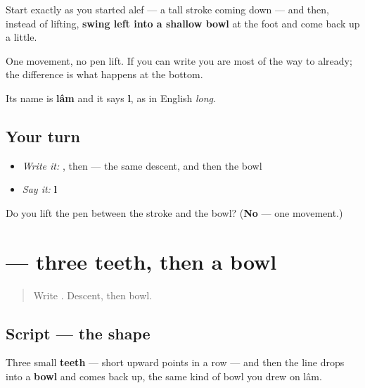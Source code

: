 \begin{quote}
\end{quote}

Start exactly as you started alef — a tall stroke coming down — and then, instead of lifting, \textbf{swing left into a shallow bowl} at the foot and come back up a little.

One movement, no pen lift. If you can write  you are most of the way to  already; the difference is what happens at the bottom.

Its name is \textbf{lâm} and it says \textbf{l}, as in English \emph{long}.

\subsection*{Your turn}
\begin{itemize}
\raggedright
  \item \emph{Write it:} , then  — the same descent, and then the bowl
  \item \emph{Say it:} \textbf{l}
\end{itemize}

\begin{tcolorbox}[breakable,colback=teal!4,colframe=teal!35!black,title={Before you move on}]
Do you lift the pen between the stroke and the bowl? (\textbf{No} — one movement.)
\end{tcolorbox}
\section[\texorpdfstring{\fa{س} (sin)}{س (sin)}]{ — three teeth, then a bowl}

\label{lesson:FA-W15-sin}



\begin{quote}
Write . Descent, then bowl.
\end{quote}

\subsection*{Script — the shape}

\begin{quote}
\end{quote}

Three small \textbf{teeth} — short upward points in a row — and then the line drops into a \textbf{bowl} and comes back up, the same kind of bowl you drew on lâm.

